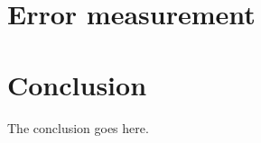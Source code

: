 \documentclass[10pt,journal,compsoc]{IEEEtran}
\begin{document}
\section{Error measurement}
\label{sec:error}

\section{Conclusion}
The conclusion goes here.

{}

\cleardoublepage
\end{document}
